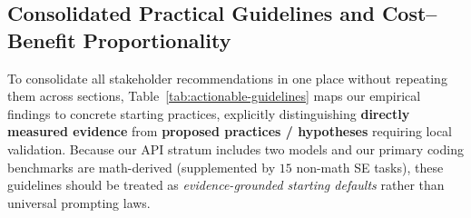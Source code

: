 \documentclass[a4paper,fleqn]{cas-sc}
\begin{document}
\subsection{Consolidated Practical Guidelines and Cost--Benefit Proportionality}\label{practical-prompt-policy-recommendation}

To consolidate all stakeholder recommendations in one place without repeating them across sections, Table~\ref{tab:actionable-guidelines} maps our empirical findings to concrete starting practices, explicitly distinguishing \textbf{directly measured evidence} from \textbf{proposed practices / hypotheses} requiring local validation. Because our API stratum includes two models and our primary coding benchmarks are math-derived (supplemented by $15$ non-math SE tasks), these guidelines should be treated as \emph{evidence-grounded starting defaults} rather than universal prompting laws.
\end{document}

